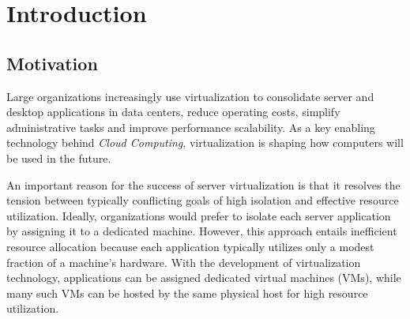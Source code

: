 \chapter{Introduction}
\section{Motivation}
Large organizations increasingly use virtualization to consolidate server
and desktop applications in data centers, reduce operating costs, simplify administrative
tasks and improve performance scalability. As a key 
enabling technology behind {\em Cloud Computing}, virtualization
is shaping how computers will be used in the future.

An important reason for the success of server virtualization 
is that it resolves the tension between typically conflicting
goals of high isolation and effective resource utilization.
Ideally, organizations would prefer to isolate each server
application by assigning it to a dedicated machine.
However, this approach entails inefficient resource allocation
because each application typically utilizes only a modest fraction of a 
machine's hardware.
With the development of virtualization technology, applications
can be assigned dedicated virtual machines (VMs),
while many such VMs can be hosted by the same physical
host for high resource utilization.

